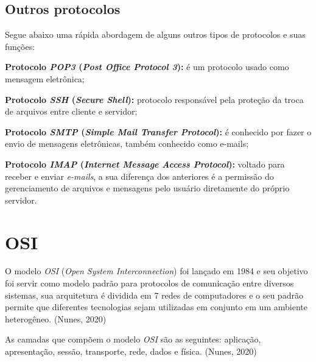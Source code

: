 \subsection{\textbf{Outros protocolos}}

\par Segue abaixo uma rápida abordagem de alguns outros tipos de protocolos e suas funções:

\par \textbf{Protocolo \textit{POP3} (\textit{Post Office Protocol 3}):} é um protocolo usado como mensagem eletrônica;

\par \textbf{Protocolo \textit{SSH} (\textit{Secure Shell}):} protocolo responsável pela proteção da troca de arquivos entre cliente e servidor;

\par \textbf{Protocolo \textit{SMTP} (\textit{Simple Mail Transfer Protocol}):} é conhecido por fazer o envio de mensagens eletrônicas, também conhecido como e-mails;

\par \textbf{Protocolo \textit{IMAP} (\textit{Internet Message Access Protocol}):} voltado para receber e enviar \textit{e-mails}, a sua diferença dos anteriores é a permissão do gerenciamento de arquivos e mensagens pelo usuário diretamente do próprio servidor.

\newpage\thispagestyle{empty}
\section{\textbf{OSI}}

\par O modelo \textit{OSI} (\textit{Open System Interconnection}) foi lançado em 1984 e seu objetivo foi servir como modelo padrão para protocolos de comunicação entre diversos sistemas, sua arquitetura é dividida em 7 redes de computadores e o seu padrão permite que diferentes tecnologias sejam utilizadas em conjunto em um ambiente heterogêneo. (Nunes, 2020)

\par As camadas que compõem o modelo \textit{OSI} são as seguintes: aplicação, apresentação, sessão, transporte, rede, dados e física. (Nunes, 2020)

